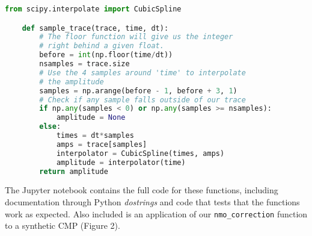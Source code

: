 \begin{lstlisting}[language=python]
    from scipy.interpolate import CubicSpline

    def sample_trace(trace, time, dt):
        # The floor function will give us the integer
        # right behind a given float.
        before = int(np.floor(time/dt))
        nsamples = trace.size
        # Use the 4 samples around 'time' to interpolate
        # the amplitude
        samples = np.arange(before - 1, before + 3, 1)
        # Check if any sample falls outside of our trace
        if np.any(samples < 0) or np.any(samples >= nsamples):
            amplitude = None
        else:
            times = dt*samples
            amps = trace[samples]
            interpolator = CubicSpline(times, amps)
            amplitude = interpolator(time)
        return amplitude
\end{lstlisting}

The Jupyter notebook contains the full code for these functions, including
documentation through Python \textit{dostrings} and code that tests that the
functions work as expected.
Also included is an application of our \texttt{nmo_correction} function to a
synthetic CMP (Figure 2).
